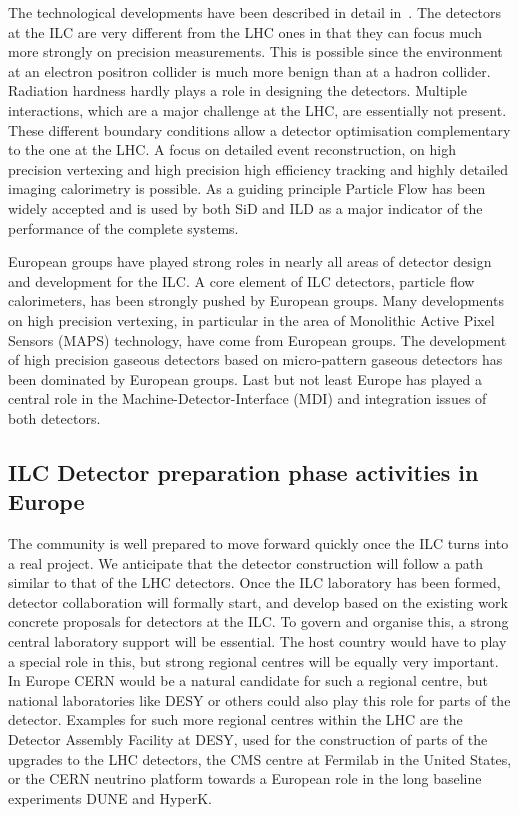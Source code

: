 \documentclass[%
 reprint,
 amsmath,amssymb,
 aps,
]{revtex4-1}
\begin{document}
The technological developments have been described in detail in~\cite{ILCESU1}. 
The detectors at the ILC are very different from the LHC ones in that they 
can focus much more strongly on precision measurements. This is possible since 
the environment at an electron positron collider is much more benign than at a 
hadron collider. Radiation hardness hardly plays a role in designing the 
detectors. Multiple interactions, which are a major challenge at the LHC, are 
essentially not present. These different boundary conditions allow a detector 
optimisation complementary to the one at the LHC. A focus on detailed event 
reconstruction, on high precision vertexing and high precision high efficiency 
tracking and highly detailed imaging calorimetry is possible. As a guiding 
principle Particle Flow has been widely accepted and is used by both SiD and ILD 
as a major indicator of the performance of the complete systems. 

European groups have played strong roles in nearly all areas of detector design 
and development for the ILC. A core element of ILC detectors, particle flow 
calorimeters, has been strongly pushed by European groups. Many developments on 
high precision vertexing, in particular in the area of Monolithic Active Pixel 
Sensors (MAPS) technology, have come from European groups. The development of 
high precision gaseous detectors based on micro-pattern gaseous detectors has 
been dominated by European groups. Last but not least Europe has played a 
central role in the Machine-Detector-Interface (MDI) and integration issues of 
both detectors.

\subsection{ILC Detector preparation phase activities in Europe~\label{sec:det:prepphase}}
The community is well prepared to move forward quickly once the ILC turns into a 
real project. We anticipate that the detector construction will follow a path 
similar to that of the LHC detectors. Once the ILC laboratory has been formed, 
detector collaboration will formally start, and develop based on the existing 
work concrete proposals for detectors at the ILC. To govern and organise this, a 
strong central laboratory support will be essential. The host country would have 
to play a special role in this, but strong regional centres will be equally very 
important. In Europe CERN would be a natural candidate for such a regional 
centre, but national laboratories like DESY or others could also play this role 
for parts of the detector. Examples for such more regional centres within the 
LHC are the Detector Assembly Facility at DESY, used for the construction of 
parts of the upgrades to the LHC detectors, the CMS centre at Fermilab in the 
United States, or the CERN neutrino platform towards a European role in the long 
baseline experiments DUNE and HyperK. 
\end{document}
